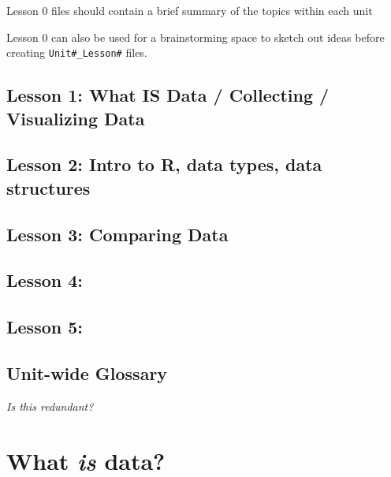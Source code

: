 \documentclass[
]{book}
\begin{document}
Lesson 0 files should contain a brief summary of the topics within each unit

Lesson 0 can also be used for a brainstorming space to sketch out ideas before creating \texttt{Unit\#\_Lesson\#} files.

\hypertarget{lesson-1-what-is-data-collecting-visualizing-data}{%
\section*{Lesson 1: What IS Data / Collecting / Visualizing Data}\label{lesson-1-what-is-data-collecting-visualizing-data}}

\hypertarget{lesson-2-intro-to-r-data-types-data-structures}{%
\section*{Lesson 2: Intro to R, data types, data structures}\label{lesson-2-intro-to-r-data-types-data-structures}}

\hypertarget{lesson-3-comparing-data}{%
\section*{Lesson 3: Comparing Data}\label{lesson-3-comparing-data}}

\hypertarget{lesson-4}{%
\section*{Lesson 4:}\label{lesson-4}}

\hypertarget{lesson-5}{%
\section*{Lesson 5:}\label{lesson-5}}

\hypertarget{unit-wide-glossary}{%
\section*{Unit-wide Glossary}\label{unit-wide-glossary}}

\emph{Is this redundant?}

\hypertarget{what-is-data}{%
\chapter{\texorpdfstring{What \emph{is} data?}{What is data?}}\label{what-is-data}}
\end{document}
